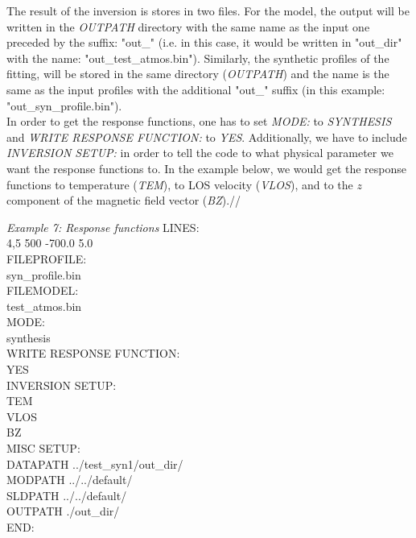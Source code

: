 The result of the inversion is stores in two files. For the model, the output will be written in the {\it OUTPATH} directory with the same name as the input one preceded by the suffix: "out\_" (i.e. in this case, it would be written in "out\_dir\/" with the name: "out\_test\_atmos.bin"). Similarly, the synthetic profiles of the fitting, will be stored in the same directory ({\it OUTPATH}) and the name is the same as the input profiles with the additional "out\_" suffix (in this example: "out\_syn\_profile.bin").\\


%

In order to get the response functions, one has to set {\it MODE:} to {\it SYNTHESIS} and {\it WRITE RESPONSE FUNCTION:}
to {\it YES}. Additionally, we have to include {\it INVERSION SETUP:} in order to tell the code to what physical parameter we want the response functions to. In the example below, we would get the response functions to temperature ({\it TEM}), to LOS velocity ({\it VLOS}), and to the $z$ component of the magnetic field vector ({\it BZ}).//

\begin{ifbox}[label={tb:example07}]{{\it Example 7: Response functions}}
  \scriptsize
LINES:\\
4,5 500 -700.0 5.0\\
FILEPROFILE:\\
syn\_profile.bin\\
FILEMODEL:\\
test\_atmos.bin\\
MODE:\\
synthesis\\
WRITE RESPONSE FUNCTION:\\
YES\\
INVERSION SETUP:\\
TEM\\
VLOS\\
BZ\\
MISC SETUP:\\
DATAPATH ../test\_syn1/out\_dir/\\
MODPATH ../../default/\\
SLDPATH ../../default/\\
OUTPATH ./out\_dir/\\
END:
  \normalsize
\end{ifbox}




%




